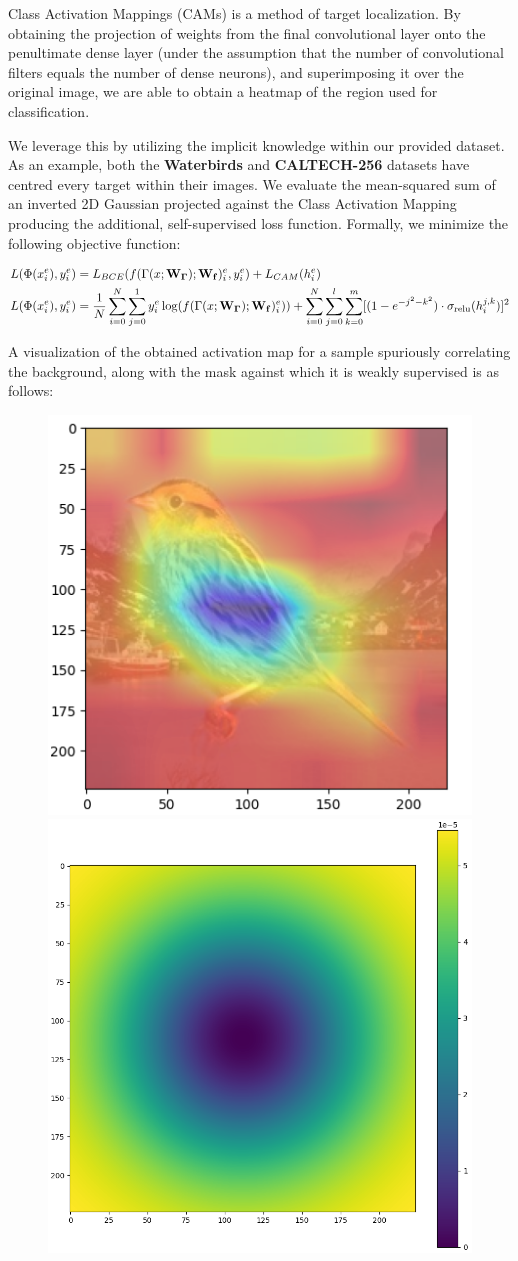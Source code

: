 \documentclass{article} %
\begin{document}
Class Activation Mappings (CAMs) \citep{zhou2016learning} is a method of target localization. By obtaining the projection of weights from the final convolutional layer onto the penultimate dense layer (under the assumption that the number of convolutional filters equals the number of dense neurons), and superimposing it over the original image, we are able to obtain a heatmap of the region used for classification.

We leverage this by utilizing the implicit knowledge within our provided dataset. As an example, both the \textbf{Waterbirds} and \textbf{CALTECH-256} datasets have centred every target within their images. We evaluate the mean-squared sum of an inverted 2D Gaussian projected against the Class Activation Mapping producing the additional, self-supervised loss function. Formally, we minimize the following objective function:

\begin{align*}
	L(\Phi(x_i^e), y_i^e) &= L_{BCE}(f(\Gamma(x;{\bf W_\Gamma});{\bf W_f})_i^e, y_i^e) + L_{CAM}(h_i^e) \\
	L(\Phi(x_i^e), y_i^e) &= \frac{1}{N}\sum^N_{i=0}\sum^1_{j=0}y_i^e\log(f(\Gamma(x;{\bf W_\Gamma});{{\bf W_f}})_i^e) ) + \sum^N_{i=0}\sum^l_{j=0}\sum^m_{k=0} [(1 - e^{-j^2 - k^2}) \cdot \sigma_{\text{relu}}(h_i^{j,k})]^2
\end{align*}

A visualization of the obtained activation map for a sample spuriously correlating the background, along with the mask against which it is weakly supervised is as follows:

\begin{figure}[h]
	\centering
	\includegraphics[width=.4\textwidth]{figs/cams.png}
	\includegraphics[width=.4\textwidth]{figs/mask.png}
\end{figure}
\end{document}
